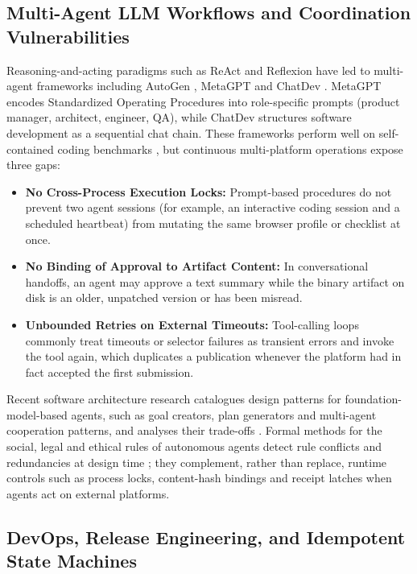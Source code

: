 \documentclass[11pt,a4paper]{article}
\theoremstyle{definition}
\begin{document}
\subsection{Multi-Agent LLM Workflows and Coordination Vulnerabilities}
\label{sec:2.2}

Reasoning-and-acting paradigms such as ReAct \citep{Yao2023ReAct} and Reflexion \citep{Shinn2023Reflexion} have led to multi-agent frameworks including AutoGen \citep{Wu2023AutoGen}, MetaGPT \citep{Hong2023MetaGPT} and ChatDev \citep{Qian2024ChatDev}. MetaGPT encodes Standardized Operating Procedures into role-specific prompts (product manager, architect, engineer, QA), while ChatDev structures software development as a sequential chat chain. These frameworks perform well on self-contained coding benchmarks \citep{Wang2024Agent, Liu2026}, but continuous multi-platform operations expose three gaps:

\begin{itemize}[leftmargin=1.8em]
    \item \textbf{No Cross-Process Execution Locks:} Prompt-based procedures do not prevent two agent sessions (for example, an interactive coding session and a scheduled heartbeat) from mutating the same browser profile or checklist at once.
    \item \textbf{No Binding of Approval to Artifact Content:} In conversational handoffs, an agent may approve a text summary while the binary artifact on disk is an older, unpatched version or has been misread.
    \item \textbf{Unbounded Retries on External Timeouts:} Tool-calling loops commonly treat timeouts or selector failures as transient errors and invoke the tool again, which duplicates a publication whenever the platform had in fact accepted the first submission.
\end{itemize}

Recent software architecture research catalogues design patterns for foundation-model-based agents, such as goal creators, plan generators and multi-agent cooperation patterns, and analyses their trade-offs \citep{Liu2025}. Formal methods for the social, legal and ethical rules of autonomous agents detect rule conflicts and redundancies at design time \citep{GetirYaman2025}; they complement, rather than replace, runtime controls such as process locks, content-hash bindings and receipt latches when agents act on external platforms.

\subsection{DevOps, Release Engineering, and Idempotent State Machines}
\label{sec:2.3}
\end{document}
